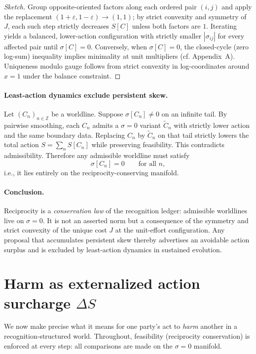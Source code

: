 \documentclass[11pt]{article}
\begin{document}
\begin{proof}[Sketch]
Group opposite-oriented factors along each ordered pair $(i,j)$ and apply the replacement $(1+\varepsilon,1-\varepsilon)\to(1,1)$; by strict convexity and symmetry of $J$, each such step strictly decreases $S[C]$ unless both factors are $1$. Iterating yields a balanced, lower-action configuration with strictly smaller $|\sigma_{ij}|$ for every affected pair until $\sigma[C]=0$. Conversely, when $\sigma[C]=0$, the closed-cycle (zero log-sum) inequality implies minimality at unit multipliers (cf. Appendix~A). Uniqueness modulo gauge follows from strict convexity in log-coordinates around $x=1$ under the balance constraint.
\end{proof}

\paragraph{Least-action dynamics exclude persistent skew.}
Let $(C_n)_{n\in\mathbb{Z}}$ be a worldline. Suppose $\sigma[C_n]\neq 0$ on an infinite tail. By pairwise smoothing, each $C_n$ admits a $\sigma=0$ variant $\widetilde C_n$ with strictly lower action and the same boundary data. Replacing $C_n$ by $\widetilde C_n$ on that tail strictly lowers the total action $S=\sum_n S[C_n]$ while preserving feasibility. This contradicts admissibility. Therefore any admissible worldline must satisfy
\[
\sigma[C_n]=0\qquad\text{for all }n,
\]
i.e., it lies entirely on the reciprocity-conserving manifold.

\paragraph{Conclusion.}
Reciprocity is a \emph{conservation law} of the recognition ledger: admissible worldlines live on $\sigma=0$. It is not an asserted norm but a consequence of the symmetry and strict convexity of the unique cost $J$ at the unit-effort configuration. Any proposal that accumulates persistent skew thereby advertises an avoidable action surplus and is excluded by least-action dynamics in sustained evolution.

\section{Harm as externalized action surcharge \texorpdfstring{$\Delta S$}{ΔS}}

We now make precise what it means for one party’s act to \emph{harm} another in a recognition‑structured world. Throughout, feasibility (reciprocity conservation) is enforced at every step: all comparisons are made on the $\sigma=0$ manifold.
\end{document}
